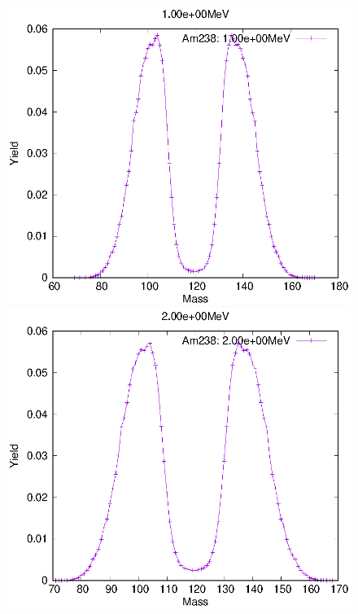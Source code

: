 \begin{figure}[htbp]
 \begin{minipage}{0.33\textwidth} \begin{center} \includegraphics[width=\textwidth]{YA/Am238_1.00e+00.eps} \end{center} \end{minipage}
\begin{minipage}{0.33\textwidth} \begin{center} \includegraphics[width=\textwidth]{YA/Am238_2.00e+00.eps} \end{center} \end{minipage}

\end{figure}
